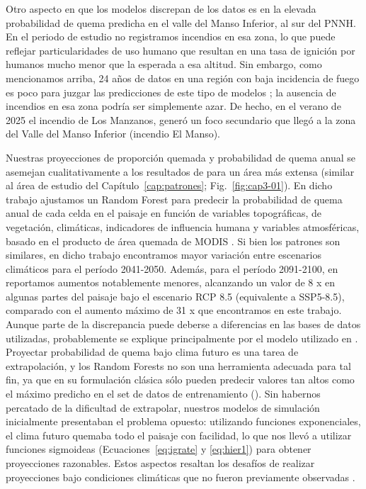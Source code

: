 Otro aspecto en que los modelos discrepan de los datos es en la elevada probabilidad de quema predicha en el valle del Manso Inferior, al sur del PNNH. En el periodo de estudio no registramos incendios en esa zona, lo que puede reflejar particularidades de uso humano que resultan en una tasa de ignición por humanos mucho menor que la esperada a esa altitud. Sin embargo, como mencionamos arriba, 24 años de datos en una región con baja incidencia de fuego es poco para juzgar las predicciones de este tipo de modelos \citep{parisien2020commentary}; la ausencia de incendios en esa zona podría ser simplemente azar. De hecho, en el verano de 2025 el incendio de Los Manzanos, generó un foco secundario que llegó a la zona del Valle del Manso Inferior (incendio El Manso).


Nuestras proyecciones de proporción quemada y probabilidad de quema anual se asemejan cualitativamente a los resultados de \citet{kitzberger_projections_2022} para un área más extensa (similar al área de estudio del Capítulo~\ref{cap:patrones}; Fig.~\ref{fig:cap3-01}). En dicho trabajo ajustamos un Random Forest para predecir la probabilidad de quema anual de cada celda en el paisaje en función de variables topográficas, de vegetación, climáticas, indicadores de influencia humana y variables atmosféricas, basado en el producto de área quemada de MODIS \citep{giglio_collection_2018}. Si bien los patrones son similares, en dicho trabajo encontramos mayor variación entre escenarios climáticos para el período 2041-2050. Además, para el período 2091-2100, en \citet{kitzberger_projections_2022} reportamos aumentos notablemente menores, alcanzando un valor de 8 x en algunas partes del paisaje bajo el escenario RCP 8.5 (equivalente a SSP5-8.5), comparado con el aumento máximo de 31 x que encontramos en este trabajo. Aunque parte de la discrepancia puede deberse a diferencias en las bases de datos utilizadas, probablemente se explique principalmente por el modelo utilizado en \citet{kitzberger_projections_2022}. Proyectar probabilidad de quema bajo clima futuro es una tarea de extrapolación, y los Random Forests no son una herramienta adecuada para tal fin, ya que en su formulación clásica sólo pueden predecir valores tan altos como el máximo predicho en el set de datos de entrenamiento (\citealt{zhang2019_RF_enhanced}). Sin habernos percatado de la dificultad de extrapolar, nuestros modelos de simulación inicialmente presentaban el problema opuesto: utilizando funciones exponenciales, el clima futuro quemaba todo el paisaje con facilidad, lo que nos llevó a utilizar funciones sigmoideas (Ecuaciones~\ref{eq:igrate} y \ref{eq:hier1}) para obtener proyecciones razonables. Estos aspectos resaltan los desafíos de realizar proyecciones bajo condiciones climáticas que no fueron previamente observadas \citep{fitzpatrick2018will}. 

